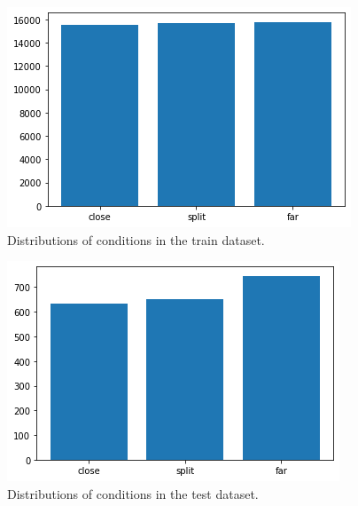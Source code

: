 \begin{figure}[ht]
  \centering
  \includegraphics[width=\columnwidth]{assets/trainset_conditions.png}
  \caption[Train dataset words]{Distributions of conditions in the train dataset.}
  \label{figure:trainset-conditions}
\end{figure}

\begin{figure}[ht]
  \centering
  \includegraphics[width=\columnwidth]{assets/testset_conditions.png}
  \caption[Test dataset words]{Distributions of conditions in the test dataset.}
  \label{figure:testset-conditions}
\end{figure}
